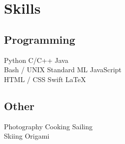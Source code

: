 \documentclass[letterpaper]{deedy-resume}
\begin{document}
\begin{minipage}[t]{0.33\textwidth}
    \sectionspace


    \section{Skills}
      \subsection{Programming}
        Python \textbullet{} C/C++ \textbullet{} Java \\
        Bash / UNIX \textbullet{} Standard ML \textbullet{} JavaScript \\
        HTML / CSS \textbullet{} Swift \textbullet{} \LaTeX \\

    \sectionspace

      \subsection{Other}
        Photography \textbullet{} Cooking \textbullet{} Sailing\\
        Skiing \textbullet{} Origami\\

  \end{minipage}
  \hfill
\end{document}
